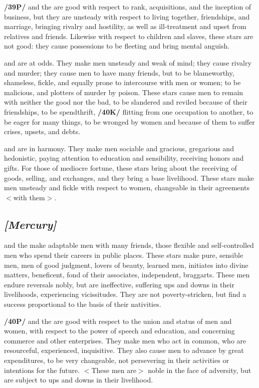 \textbf{/39P/}\Venus\xspace and the \Moon\xspace are good with respect to rank, acquisitions, and the inception of business,
but they are unsteady with respect to living together, friendships, and marriage, bringing rivalry and hostility, as well as ill-treatment and upset from relatives and friends. Likewise with respect to children and slaves, these stars are not good: they cause possessions to be fleeting and bring mental anguish.

\Venus\xspace and \Mars\xspace are at odds. They make men unsteady and weak of mind; they cause rivalry and murder; they cause men to have many friends, but to be blameworthy, shameless, fickle, and equally prone to intercourse with men or women; to be malicious, and plotters of murder by poison. These stars cause men to remain with neither the good nor the bad, to be slandered and reviled because of their friendships, to
be spendthrift, \textbf{/40K/} flitting from one occupation to another, to be eager for many things, to be wronged by women and because of them to suffer crises, upsets, and debts.

\Venus\xspace and \Mercury\xspace are in harmony. They make men sociable and gracious, gregarious and hedonistic, paying attention to education and sensibility, receiving honors and gifts. For those of mediocre fortune, these stars bring about the receiving of goods, selling, and exchanges, and they bring a base livelihood. These stars make men unsteady and fickle with respect to women, changeable in their agreements $<$with
them$>$.

\secbr
\subsection{\textit{[Mercury]}}
\Mercury\xspace and the \Sun\xspace make adaptable men with many friends, those flexible and self-controlled men who spend their careers in public places. These stars make pure, sensible men, men of good judgment, lovers of beauty, learned men, initiates into divine matters, beneficent, fond of their associates, independent, braggarts. These men endure reversals nobly, but are ineffective, suffering ups and downs in their
livelihoods, experiencing vicissitudes. They are not poverty-stricken, but find a success proportional to the basis of their nativities.

\textbf{/40P/}\Mercury\xspace and the \Moon\xspace are good with respect to the union and status of men and women, with respect to the power of speech and education, and concerning commerce and other enterprises. They make men who act in common, who are resourceful, experienced, inquisitive. They also cause men to advance by great expenditures, to be very changeable, not persevering in their activities or intentions for the future.
$<$These men are$>$ noble in the face of adversity, but are subject to ups and downs in their livelihood.

